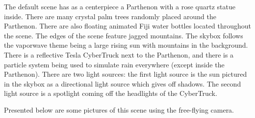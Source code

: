 \documentclass[10pt,letterpaper,oneside]{article}
\numberwithin{equation}{section}		%
\numberwithin{figure}{section}			%
\numberwithin{table}{section}				%
\begin{document}
The default scene has as a centerpiece a Parthenon with a rose quartz statue inside. There are many crystal palm trees randomly placed around the Parthenon. There are also floating animated Fiji water bottles located throughout the scene. The edges of the scene feature jagged mountains. The skybox follows the vaporwave theme being a large rising sun with mountains in the background. There is a reflective Tesla CyberTruck next to the Parthenon, and there is a particle system being used to simulate rain everywhere (except inside the Parthenon). There are two light sources: the first light source is the sun pictured in the skybox as a directional light source which gives off shadows. The second light source is a spotlight coming off the headlights of the CyberTruck.

Presented below are some pictures of this scene using the free-flying camera.
\end{document}

